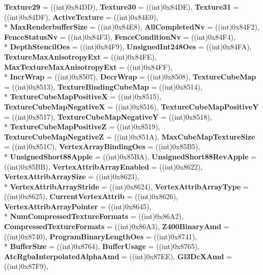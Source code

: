 \begin{DoxyCompactItemize}
{\bfseries Texture29} = ((int)0x84\-D\-D), 
{\bfseries Texture30} = ((int)0x84\-D\-E), 
{\bfseries Texture31} = ((int)0x84\-D\-F), 
{\bfseries Active\-Texture} = ((int)0x84\-E0), 
\\*
{\bfseries Max\-Renderbuffer\-Size} = ((int)0x84\-E8), 
{\bfseries All\-Completed\-Nv} = ((int)0x84\-F2), 
{\bfseries Fence\-Status\-Nv} = ((int)0x84\-F3), 
{\bfseries Fence\-Condition\-Nv} = ((int)0x84\-F4), 
\\*
{\bfseries Depth\-Stencil\-Oes} = ((int)0x84\-F9), 
{\bfseries Unsigned\-Int248\-Oes} = ((int)0x84\-F\-A), 
{\bfseries Texture\-Max\-Anisotropy\-Ext} = ((int)0x84\-F\-E), 
{\bfseries Max\-Texture\-Max\-Anisotropy\-Ext} = ((int)0x84\-F\-F), 
\\*
{\bfseries Incr\-Wrap} = ((int)0x8507), 
{\bfseries Decr\-Wrap} = ((int)0x8508), 
{\bfseries Texture\-Cube\-Map} = ((int)0x8513), 
{\bfseries Texture\-Binding\-Cube\-Map} = ((int)0x8514), 
\\*
{\bfseries Texture\-Cube\-Map\-Positive\-X} = ((int)0x8515), 
{\bfseries Texture\-Cube\-Map\-Negative\-X} = ((int)0x8516), 
{\bfseries Texture\-Cube\-Map\-Positive\-Y} = ((int)0x8517), 
{\bfseries Texture\-Cube\-Map\-Negative\-Y} = ((int)0x8518), 
\\*
{\bfseries Texture\-Cube\-Map\-Positive\-Z} = ((int)0x8519), 
{\bfseries Texture\-Cube\-Map\-Negative\-Z} = ((int)0x851\-A), 
{\bfseries Max\-Cube\-Map\-Texture\-Size} = ((int)0x851\-C), 
{\bfseries Vertex\-Array\-Binding\-Oes} = ((int)0x85\-B5), 
\\*
{\bfseries Unsigned\-Short88\-Apple} = ((int)0x85\-B\-A), 
{\bfseries Unsigned\-Short88\-Rev\-Apple} = ((int)0x85\-B\-B), 
{\bfseries Vertex\-Attrib\-Array\-Enabled} = ((int)0x8622), 
{\bfseries Vertex\-Attrib\-Array\-Size} = ((int)0x8623), 
\\*
{\bfseries Vertex\-Attrib\-Array\-Stride} = ((int)0x8624), 
{\bfseries Vertex\-Attrib\-Array\-Type} = ((int)0x8625), 
{\bfseries Current\-Vertex\-Attrib} = ((int)0x8626), 
{\bfseries Vertex\-Attrib\-Array\-Pointer} = ((int)0x8645), 
\\*
{\bfseries Num\-Compressed\-Texture\-Formats} = ((int)0x86\-A2), 
{\bfseries Compressed\-Texture\-Formats} = ((int)0x86\-A3), 
{\bfseries Z400\-Binary\-Amd} = ((int)0x8740), 
{\bfseries Program\-Binary\-Length\-Oes} = ((int)0x8741), 
\\*
{\bfseries Buffer\-Size} = ((int)0x8764), 
{\bfseries Buffer\-Usage} = ((int)0x8765), 
{\bfseries Atc\-Rgba\-Interpolated\-Alpha\-Amd} = ((int)0x87\-E\-E), 
{\bfseries Gl3\-Dc\-X\-Amd} = ((int)0x87\-F9), 

\end{DoxyCompactItemize}
